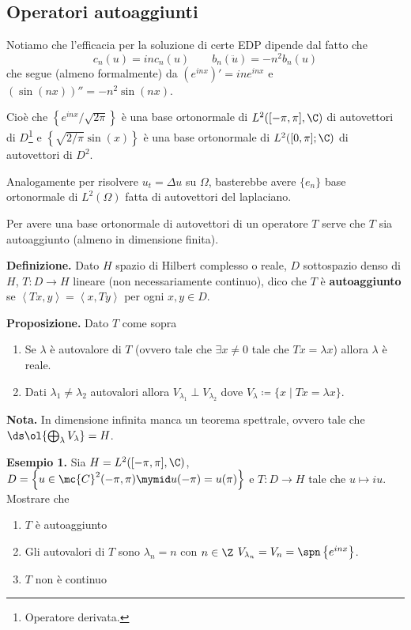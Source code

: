 \subsection{Operatori autoaggiunti}

Notiamo che l'efficacia per la soluzione di certe EDP dipende dal fatto che
%
$$
	c_n(u) = in c_n(u) \qquad b_n(\ddot u) = -n^2 b_n(u)
$$
%
che segue (almeno formalmente) da $(e^{inx})' = in e^{inx}$ e $(\sin(nx))'' = -n^2 \sin(nx)$.

Cioè che $\left\{ e^{inx} / \sqrt{2\pi} \right\}$ è una base ortonormale di $L^2([-\pi,\pi],\C)$ di autovettori di $D$\footnote{Operatore derivata.} e $\left\{ \sqrt{2/\pi} \sin(x)  \right\}$ è una base ortonormale di $L^2([0,\pi];\C)$ di autovettori di $D^2$.

Analogamente per risolvere $u_t = \Delta u$ su $\Omega$, basterebbe avere $\{ e_n \}$ base ortonormale di $L^2(\Omega)$ fatta di autovettori del laplaciano.

Per avere una base ortonormale di autovettori di un operatore $T$ serve che $T$ sia autoaggiunto (almeno in dimensione finita).

\textbf{Definizione.} Dato $H$ spazio di Hilbert complesso o reale, $D$ sottospazio denso di $H$, $T \colon D \to H$ lineare (non necessariamente continuo), dico che $T$ è \textbf{autoaggiunto} se $\left<Tx,y \right> = \left<x,Ty \right>$ per ogni $x,y \in D$.

\textbf{Proposizione.} Dato $T$ come sopra
\begin{enumerate}

	\item Se $\lambda$ è autovalore di $T$ (ovvero tale che $\exists x \neq 0$ tale che $Tx = \lambda x$) allora $\lambda$ è reale.


	\item Dati $\lambda_1 \neq \lambda_2$ autovalori allora $V_{\lambda_1} \perp V_{\lambda_2}$ dove $V_\lambda \coloneqq \{ x \mid Tx = \lambda x \}$.

\end{enumerate}

\textbf{Nota.} In dimensione infinita manca un teorema spettrale, ovvero tale che $\ds \ol{\bigoplus_\lambda V_\lambda} = H$.


\textbf{Esempio 1.} Sia $H = L^2([-\pi,\pi],\C)$, $D = \left\{ u \in \mc{C}^2 (-\pi,\pi) \mymid u(-\pi) = u(\pi) \right\}$ e $T \colon D \to H$ tale che $u \mapsto iu$.
Mostrare che
\begin{enumerate}

	\item $T$ è autoaggiunto

	\item Gli autovalori di $T$ sono $\lambda_n = n$ con $n \in \Z$ $V_{\lambda_n} = V_n = \spn \left\{ e^{inx} \right\}$.

	\item $T$ non è continuo

\end{enumerate}


